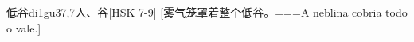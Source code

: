 \begin{EntryWithPhonetic}{低谷}{di1gu3}{7,7}{⼈、⾕}[HSK 7-9]
  [雾气笼罩着整个低谷。===A neblina cobria todo o vale.]
\end{EntryWithPhonetic}
